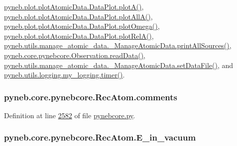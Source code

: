 \hyperlink{plot_atomic_data_8py_source_l00116}{pyneb.\+plot.\+plot\+Atomic\+Data.\+Data\+Plot.\+plot\+A()}, \hyperlink{plot_atomic_data_8py_source_l00188}{pyneb.\+plot.\+plot\+Atomic\+Data.\+Data\+Plot.\+plot\+All\+A()}, \hyperlink{plot_atomic_data_8py_source_l00372}{pyneb.\+plot.\+plot\+Atomic\+Data.\+Data\+Plot.\+plot\+Omega()}, \hyperlink{plot_atomic_data_8py_source_l00261}{pyneb.\+plot.\+plot\+Atomic\+Data.\+Data\+Plot.\+plot\+Rel\+A()}, \hyperlink{manage__atomic__data_8py_source_l00431}{pyneb.\+utils.\+manage\+\_\+atomic\+\_\+data.\+\_\+\+Manage\+Atomic\+Data.\+print\+All\+Sources()}, \hyperlink{pynebcore_8py_source_l03589}{pyneb.\+core.\+pynebcore.\+Observation.\+read\+Data()}, \hyperlink{manage__atomic__data_8py_source_l00380}{pyneb.\+utils.\+manage\+\_\+atomic\+\_\+data.\+\_\+\+Manage\+Atomic\+Data.\+set\+Data\+File()}, and \hyperlink{logging_8py_source_l00115}{pyneb.\+utils.\+logging.\+my\+\_\+logging.\+timer()}.

\hypertarget{classpyneb_1_1core_1_1pynebcore_1_1_rec_atom_ada8efc5b9724d1c0e76bd7c63508803e}{}
\subsubsection[{comments}]{\setlength{\rightskip}{0pt plus 5cm}pyneb.\+core.\+pynebcore.\+Rec\+Atom.\+comments}\label{classpyneb_1_1core_1_1pynebcore_1_1_rec_atom_ada8efc5b9724d1c0e76bd7c63508803e}


Definition at line \hyperlink{pynebcore_8py_source_l02582}{2582} of file \hyperlink{pynebcore_8py_source}{pynebcore.\+py}.

\hypertarget{classpyneb_1_1core_1_1pynebcore_1_1_rec_atom_ad8b22dbde0d9861d94cf7aeacf0d93be}{}
\subsubsection[{E\+\_\+in\+\_\+vacuum}]{\setlength{\rightskip}{0pt plus 5cm}pyneb.\+core.\+pynebcore.\+Rec\+Atom.\+E\+\_\+in\+\_\+vacuum}\label{classpyneb_1_1core_1_1pynebcore_1_1_rec_atom_ad8b22dbde0d9861d94cf7aeacf0d93be}



